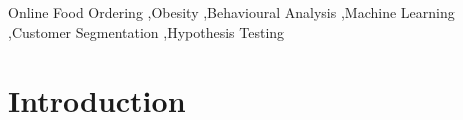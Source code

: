 \documentclass[a4paper,fleqn]{cas-sc}
\begin{document}
\begin{keywords}
Online Food Ordering \sep Obesity \sep Behavioural Analysis \sep Machine Learning \sep Customer Segmentation \sep Hypothesis Testing
\end{keywords}


\maketitle

\section{Introduction}
% 
% 
% 
\end{document}
